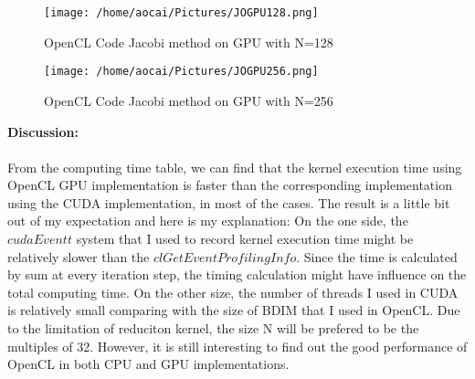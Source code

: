 \documentclass[12pt]{article}
\begin{document}
\begin{figure}[H]
	\centering
	\texttt{[image: /home/aocai/Pictures/JOGPU128.png]}
	\caption[Optional caption]{OpenCL Code Jacobi method on GPU with N=128}
	\label{fig:JOGPU128}
\end{figure}
\begin{figure}[H]
	\centering
	\texttt{[image: /home/aocai/Pictures/JOGPU256.png]}
	\caption[Optional caption]{OpenCL Code Jacobi method on GPU with N=256}
	\label{fig:JOGPU256}
\end{figure}
{\bfseries Discussion:}\\\\
From the computing time table, we can find that the kernel execution time using OpenCL GPU implementation is faster than the corresponding implementation using the CUDA implementation, in most of the cases. The result is a little bit out of my expectation and here is my explanation:
On the one side, the $cudaEvent{t}$ system that I used to record kernel execution time might be relatively slower than the $clGetEventProfilingInfo$. Since the time is calculated by sum at every iteration step, the timing calculation might have influence on the total computing time. On the other size, the number of threads I used in CUDA is relatively small comparing with the size of BDIM that I used in OpenCL. Due to the limitation of reduciton kernel, the size N will be prefered to be the multiples of 32. However, it is still interesting to find out the good performance of OpenCL in both CPU and GPU implementations.

%
%
%
\end{document}
